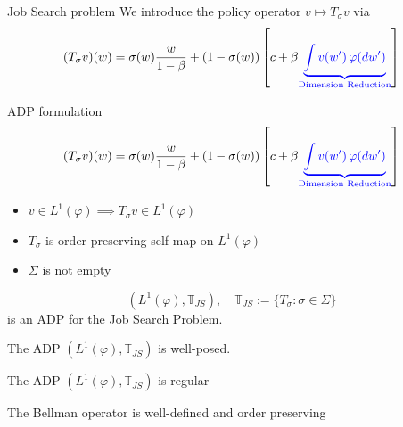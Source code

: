 \documentclass[aspectratio=169]{beamer} %
\begin{document}
\begin{frame}{Job Search problem}
We introduce the policy operator $v\mapsto T_\sigma v$ via
$$
(T_\sigma v)(w) = \sigma(w) \frac{w}{1-\beta} + (1-\sigma(w))\left[c+\beta\textcolor{blue}{\underbrace{\int v(w')\, \varphi(dw')}_{\text{Dimension Reduction}}}\right]
$$
    
\end{frame}

\begin{frame}{ADP formulation}
$$
(T_\sigma v)(w) = \sigma(w) \frac{w}{1-\beta} + (1-\sigma(w))\left[c+\beta\textcolor{blue}{\underbrace{\int v(w')\, \varphi(dw')}_{\text{Dimension Reduction}}}\right]
$$

\begin{itemize}
    \item $v\in L^1(\varphi)\implies T_\sigma v\in L^1(\varphi)$
    \item $T_\sigma$ is order preserving self-map on $L^1(\varphi)$
    \item $\Sigma$ is not empty
\end{itemize}
$$
(L^1(\varphi),\mathbb{T}_{JS}), \quad \mathbb{T}_{JS}:=\{T_\sigma: \sigma\in\Sigma\}
$$
is an ADP for the Job Search Problem. 
\end{frame}

\begin{frame}{The ADP $(L^1(\varphi),\mathbb{T}_{JS})$ is well-posed.}
    
\end{frame}

\begin{frame}{The ADP $(L^1(\varphi),\mathbb{T}_{JS})$ is regular}
    
\end{frame}

\begin{frame}{The Bellman operator is well-defined and order preserving}
    
\end{frame}
\end{document}
